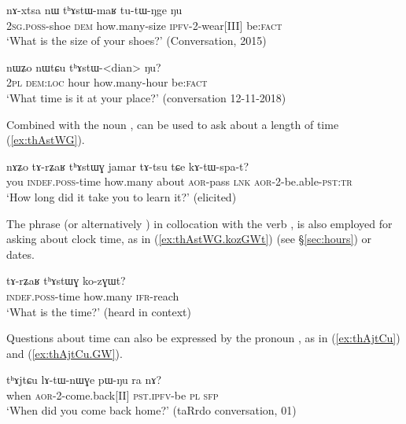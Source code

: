  \begin{exe}
\ex \label{ex:thAstWmaR}
 \gll   nɤ-xtsa nɯ tʰɤstɯ-maʁ tu-tɯ-ŋge ŋu   \\
\textsc{2sg}.\textsc{poss}-shoe \textsc{dem} how.many-size \textsc{ipfv}-2-wear[III] be:\textsc{fact} \\ 
\glt `What is the size of your shoes?'  (Conversation, 2015)
\end{exe} 
 
 \begin{exe}
\ex \label{ex:thAstWdian}
 \gll  nɯʑo nɯtɕu tʰɤstɯ-<dian>  ŋu? \\
 \textsc{2pl} \textsc{dem}:\textsc{loc} hour how.many-hour be:\textsc{fact} \\
 \glt `What time is it at your place?' (conversation 12-11-2018)
\end{exe} 

Combined with the noun , 	 can be used to ask about a length of time (\ref{ex:thAstWG}).

\begin{exe}
\ex \label{ex:thAstWG}
 \gll   nɤʑo tɤ-rʑaʁ tʰɤstɯɣ jamar tɤ-tsu tɕe kɤ-tɯ-spa-t?  \\
 you \textsc{indef}.\textsc{poss}-time how.many about \textsc{aor}-pass \textsc{lnk} \textsc{aor}-2-be.able-\textsc{pst}:\textsc{tr} \\
\glt   `How long did it take you to learn it?' (elicited)
\end{exe} 

The phrase  (or alternatively ) in collocation with the verb , is also employed for asking about clock time, as in (\ref{ex:thAstWG.kozGWt}) (see §\ref{sec:hours}) or dates. %

 \begin{exe}
\ex \label{ex:thAstWG.kozGWt}
 \gll   tɤ-rʑaʁ tʰɤstɯɣ ko-zɣɯt? \\
  \textsc{indef}.\textsc{poss}-time how.many  \textsc{ifr}-reach \\
  \glt `What is the time?' (heard in context)
  \end{exe} 
    
Questions about time can also be expressed by the pronoun , as in  (\ref{ex:thAjtCu}) and (\ref{ex:thAjtCu.GW}).

\begin{exe}
\ex \label{ex:thAjtCu}
\gll  tʰɤjtɕu lɤ-tɯ-nɯɣe pɯ-ŋu ra nɤ?    \\
 when \textsc{aor}-2-come.back[II] \textsc{pst}.\textsc{ipfv}-be \textsc{pl} \textsc{sfp} \\
\glt  `When did you come back home?' (taRrdo conversation, 01)
\end{exe} 


